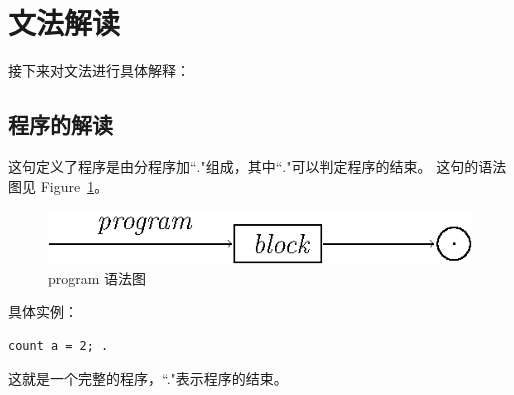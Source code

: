 \section{文法解读}
接下来对文法进行具体解释：
\subsection{程序的解读}

这句定义了程序是由分程序加``$.$"组成，其中``$.$"可以判定程序的结束。
这句的语法图见 Figure~\ref{program}。
\begin{figure}[h]
\begin{center}
    \includegraphics[scale=1]{Figures/program.eps}
\end{center}
\caption{program 语法图}
\label{program}
\end{figure}
具体实例：
\begin{verbatim}
count a = 2; .
\end{verbatim}
这就是一个完整的程序，``."表示程序的结束。

